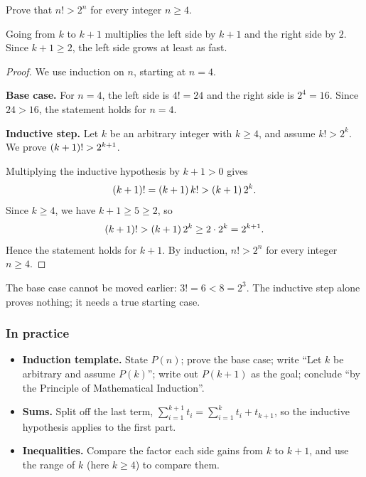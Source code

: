 \begin{example}
    Prove that $n! > 2^n$ for every integer $n \geq 4$.
\end{example}
\begin{remark}
    Going from $k$ to $k+1$ multiplies the left side by $k+1$ and the right
    side by $2$. Since $k+1\geq 2$, the left side grows at least as fast.
\end{remark}
\begin{proof}
    We use induction on $n$, starting at $n=4$.

    \textbf{Base case.} For $n = 4$, the left side is $4! = 24$ and the right
    side is $2^4 = 16$. Since $24 > 16$, the statement holds for $n = 4$.

    \textbf{Inductive step.} Let $k$ be an arbitrary integer with $k \geq 4$,
    and assume $k! > 2^k$. We prove $\left(k + 1\right)! > 2^{k + 1}$.

    Multiplying the inductive hypothesis by $k+1>0$ gives
    \begin{equation*}
        \left(k + 1\right)! = \left(k + 1\right)k! > \left(k + 1\right)2^k.
    \end{equation*}
    Since $k \geq 4$, we have $k + 1 \geq 5 \geq 2$, so
    \begin{equation*}
        \left(k + 1\right)! > \left(k + 1\right)2^k \geq 2 \cdot 2^k = 2^{k + 1}.
    \end{equation*}
    Hence the statement holds for $k+1$. By induction, $n! > 2^n$ for every
    integer $n \geq 4$.
\end{proof}
\begin{remark}
    The base case cannot be moved earlier: $3! = 6 < 8 = 2^3$. The inductive
    step alone proves nothing; it needs a true starting case.
\end{remark}

\subsubsection*{In practice}
\begin{itemize}
    \item \textbf{Induction template.} State $P(n)$; prove the base case;
    write ``Let $k$ be arbitrary and assume $P(k)$''; write out $P(k+1)$ as
    the goal; conclude ``by the Principle of Mathematical Induction''.
    \item \textbf{Sums.} Split off the last term,
    $\sum_{i=1}^{k+1}t_i=\sum_{i=1}^{k}t_i+t_{k+1}$, so the inductive
    hypothesis applies to the first part.
    \item \textbf{Inequalities.} Compare the factor each side gains from
    $k$ to $k+1$, and use the range of $k$ (here $k\geq4$) to compare them.
\end{itemize}
